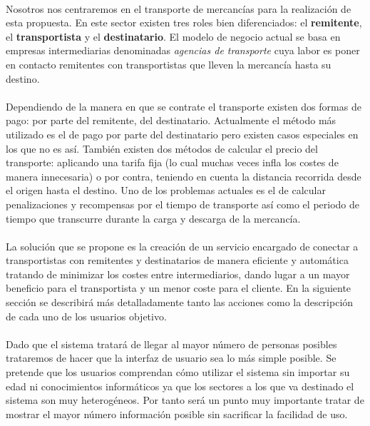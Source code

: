 \documentclass[10pt, a4paper,spanish]{article}
\begin{document}
		\paragraph{}
		Nosotros nos centraremos en el transporte de mercancías para la realización de esta propuesta. En este sector existen tres roles bien diferenciados: el \textbf{remitente}, el \textbf{transportista} y el \textbf{destinatario}. El modelo de negocio actual se basa en empresas intermediarias denominadas \textit{agencias de transporte} cuya labor es poner en contacto remitentes con transportistas que lleven la mercancía hasta su destino.

		\paragraph{}
		Dependiendo de la manera en que se contrate el transporte existen dos formas de pago: por parte del remitente, del destinatario. Actualmente el método más utilizado es el de pago por parte del destinatario pero existen casos especiales en los que no es así. También existen dos métodos de calcular el precio del transporte: aplicando una tarifa fija (lo cual muchas veces infla los costes de manera innecesaria) o por contra, teniendo en cuenta la distancia recorrida desde el origen hasta el destino. Uno de los problemas actuales es el de calcular penalizaciones y recompensas por el tiempo de transporte así como el periodo de tiempo que transcurre durante la carga y descarga de la mercancía.

		\paragraph{}
		La solución que se propone es la creación de un servicio encargado de conectar a transportistas con remitentes y destinatarios de manera eficiente y automática tratando de minimizar los costes entre intermediarios, dando lugar a un mayor beneficio para el transportista y un menor coste para el cliente. En la siguiente sección se describirá más detalladamente tanto las acciones como la descripción de cada uno de los usuarios objetivo.

		\paragraph{}
		Dado que el sistema tratará de llegar al mayor número de personas posibles trataremos de hacer que la interfaz de usuario sea lo más simple posible.
		Se pretende que los usuarios comprendan cómo utilizar el sistema sin importar su edad ni conocimientos informáticos ya que los sectores a los que va destinado el sistema son muy heterogéneos. Por tanto será un punto muy importante tratar de mostrar el mayor número información posible sin sacrificar la facilidad de uso.
\end{document}
